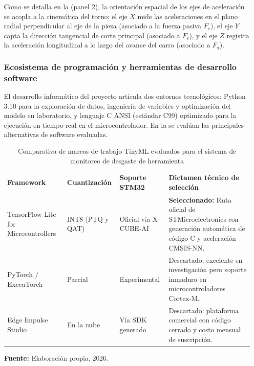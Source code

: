 Como se detalla en la  (panel 2), la orientación espacial de los ejes de aceleración se acopla a la cinemática del torno: el eje $X$ mide las aceleraciones en el plano radial perpendicular al eje de la pieza (asociado a la fuerza pasiva $F_r$), el eje $Y$ capta la dirección tangencial de corte principal (asociado a $F_c$), y el eje $Z$ registra la aceleración longitudinal a lo largo del avance del carro (asociado a $F_a$).


\subsubsection{Ecosistema de programación y herramientas de desarrollo software}

El desarrollo informático del proyecto articula dos entornos tecnológicos: Python 3.10 para la exploración de datos, ingeniería de variables y optimización del modelo en laboratorio, y lenguaje C ANSI (estándar C99) optimizado para la ejecución en tiempo real en el microcontrolador. En la  se evalúan las principales alternativas de software evaluadas.

\begin{table}[H]
\centering
\caption{Comparativa de marcos de trabajo TinyML evaluados para el sistema de monitoreo de desgaste de herramienta}\label{tab:comparativa_tinyml_frameworks}
\vspace{2mm}
\small
\begin{tabular}{p{3.2cm}p{2.3cm}p{2.3cm}p{5.4cm}}
\hline
\textbf{Framework} & \textbf{Cuantización} & \textbf{Soporte STM32} & \textbf{Dictamen técnico de selección} \\ \hline \hline
TensorFlow Lite for Microcontrollers & INT8 (PTQ y QAT) & Oficial vía X-CUBE-AI & \textbf{Seleccionado:} Ruta oficial de STMicroelectronics con generación automática de código C y aceleración CMSIS-NN. \\ \hline
PyTorch / ExecuTorch & Parcial & Experimental & Descartado: excelente en investigación pero soporte inmaduro en microcontroladores Cortex-M. \\ \hline
Edge Impulse Studio & En la nube & Vía SDK generado & Descartado: plataforma comercial con código cerrado y costo mensual de suscripción. \\ \hline
\end{tabular}
\par\vspace{2mm}
\footnotesize \textbf{Fuente:} Elaboración propia, 2026.
\end{table}


